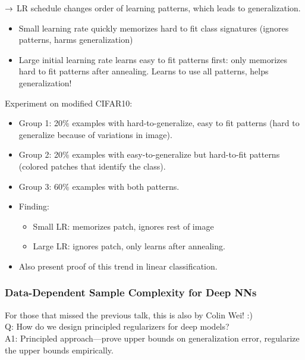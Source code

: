 $\rightarrow$ LR schedule changes order of learning patterns, which leads to generalization.

\begin{itemize}
    \item Small learning rate quickly memorizes hard to fit class signatures (ignores patterns, harms generalization)
    
    \item Large initial learning rate learns easy to fit patterns first: only memorizes hard to fit patterns after annealing. Learns to use all patterns, helps generalization!
\end{itemize}

Experiment on modified CIFAR10:
\begin{itemize}
    \item Group 1: 20\% examples with hard-to-generalize, easy to fit patterns (hard to generalize because of variations in image).
    \item Group 2: 20\% examples with easy-to-generalize but hard-to-fit patterns (colored patches that identify the class).
    \item Group 3: 60\% examples with both patterns.
    
    \item Finding:
    \begin{itemize}
        \item Small LR: memorizes patch, ignores rest of image
        \item Large LR: ignores patch, only learns after annealing.
    \end{itemize}
    \item Also present proof of this trend in linear classification.
\end{itemize}

\spacerule
\subsubsection{Data-Dependent Sample Complexity for Deep NNs~\cite{wei2019data}}

For those that missed the previous talk, this is also by Colin Wei! :) \\

Q: How do we design principled regularizers for deep models? \\

A1: Principled approach---prove upper bounds on generalization error, regularize the upper bounds empirically. \\

